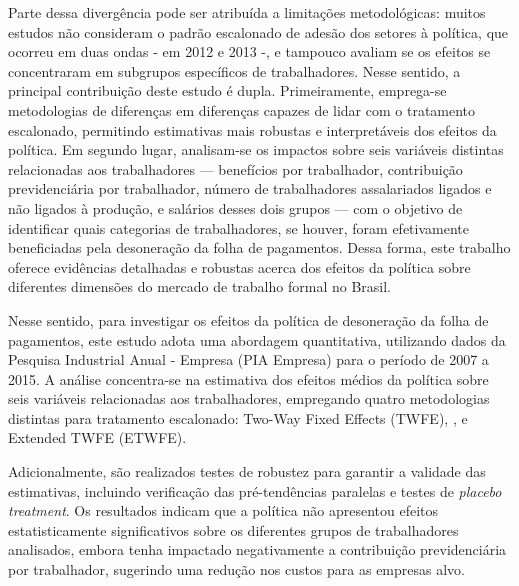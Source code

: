 \documentclass[12pt,a4paper,oneside]{article}
\begin{document}
		Parte dessa divergência pode ser atribuída a limitações metodológicas: muitos estudos não consideram o padrão escalonado de adesão dos setores à política, que ocorreu em duas ondas - em 2012 e 2013 -, e tampouco avaliam se os efeitos se concentraram em subgrupos específicos de trabalhadores. Nesse sentido, a principal contribuição deste estudo é dupla. Primeiramente, emprega-se metodologias de diferenças em diferenças capazes de lidar com o tratamento escalonado, permitindo estimativas mais robustas e interpretáveis dos efeitos da política. Em segundo lugar, analisam-se os impactos sobre seis variáveis distintas relacionadas aos trabalhadores — benefícios por trabalhador, contribuição previdenciária por trabalhador, número de trabalhadores assalariados ligados e não ligados à produção, e salários desses dois grupos — com o objetivo de identificar quais categorias de trabalhadores, se houver, foram efetivamente beneficiadas pela desoneração da folha de pagamentos. Dessa forma, este trabalho oferece evidências detalhadas e robustas acerca dos efeitos da política sobre diferentes dimensões do mercado de trabalho formal no Brasil.

		
		Nesse sentido, para investigar os efeitos da política de desoneração da folha de pagamentos, este estudo adota uma abordagem quantitativa, utilizando dados da Pesquisa Industrial Anual - Empresa (PIA Empresa) para o período de 2007 a 2015. A análise concentra-se na estimativa dos efeitos médios da política sobre seis variáveis relacionadas aos trabalhadores, empregando quatro metodologias distintas para tratamento escalonado: Two-Way Fixed Effects (TWFE), \citet{Callaway2021}, \citet{Sun2021} e Extended TWFE (ETWFE).  
		
		Adicionalmente, são realizados testes de robustez para garantir a validade das estimativas, incluindo verificação das pré-tendências paralelas e testes de \textit{placebo treatment}. Os resultados indicam que a política não apresentou efeitos estatisticamente significativos sobre os diferentes grupos de trabalhadores analisados, embora tenha impactado negativamente a contribuição previdenciária por trabalhador, sugerindo uma redução nos custos para as empresas alvo. 
		
\end{document}
